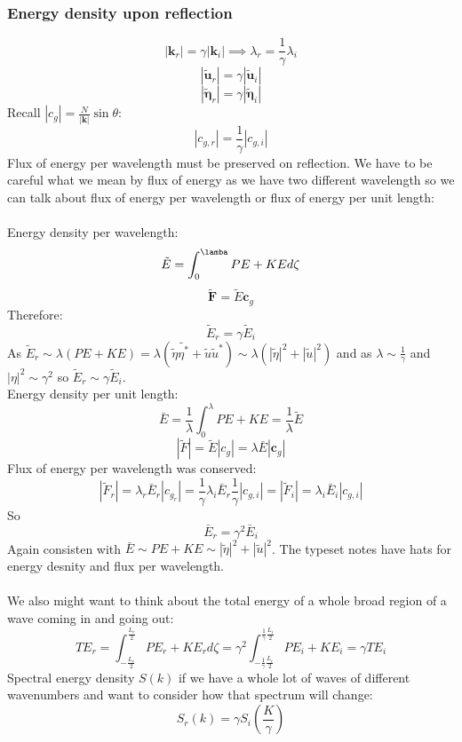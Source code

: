 \documentclass{article}
\begin{document}
\subsubsection{Energy density upon reflection}
$$
|\bm k_r|= \gamma |\bm k_i| \implies \lambda_r = \frac{1}{\gamma} \lambda_i
$$
$$
|\tilde{\bm u}_r | = \gamma |\tilde{\bm u}_i|
$$
$$
|\tilde{\bm \eta}_r | = \gamma |\tilde{\bm \eta}_i|
$$
Recall $|c_g|  = \frac{N}{|\bm k|} \sin \theta$:
$$
|c_{g,r}| = \frac{1}{\gamma} |c_{g,i}|
$$
Flux of energy per wavelength must be preserved on reflection. We have to be careful what we mean by flux of energy as we have two different wavelength so we can talk about flux of energy per wavelength or flux of energy per unit length:\\\\
Energy density per wavelength:
$$
\tilde E = \int_0^{\lamba} PE + KE d \zeta
$$
$$
\tilde {\bm F} = \tilde E \bm c_g
$$
Therefore:
$$
\tilde E_r = \gamma \tilde E_i
$$
As $\tilde E_r \sim \lambda( PE + KE) = \lambda ( \tilde{\eta} \tilde{\eta^*} + \tilde u \tilde u^*) \sim \lambda( |\tilde \eta|^2 + |\tilde u|^2)$ and as $\lambda \sim \frac{1}{\gamma}$ and $|\eta|^2 \sim \gamma^2$ so $\tilde E_r \sim \gamma \tilde E_i$.\\
Energy density per unit length:
$$
\bar E = \frac{1}{\lambda} \int_0^{\lambda} PE + KE = \frac{1}{\lambda} \tilde E
$$
$$
|\tilde F| = \tilde E | c_g | = \lambda \bar E | \bm c_g|
$$
Flux of energy per wavelength was conserved:
$$
|\tilde F_r| = \lambda_r \bar E_r|c_{g_r}| = \frac{1}{\gamma} \lambda_i \bar E_r \frac{1}{\gamma} |c_{g,i}| = |\tilde F_i| = \lambda_i \bar E_i |c_{g,i}|
$$
So 
$$
\bar E_r = \gamma^2 \bar E_i
$$
Again consisten with $\bar E \sim PE + KE \sim |\tilde \eta|^2 + | \tilde u|^2$. The typeset notes have hats for energy desnity and flux per wavelength.\\\\
We also might want to think about the total energy of a whole broad region of a wave coming in and going out:
$$
TE_r = \int_{- \frac{L_r}{2}}^{\frac{L_r}{2}} PE_r + KE_r d \zeta = \gamma^2 \int_{- \frac{1}{\gamma} \frac{L_i}{2}}^{\frac{1}{\gamma}\frac{L_i}{2}} PE_i + KE_i = \gamma TE_i
$$
Spectral energy density $S(k)$ if we have a whole lot of waves of different wavenumbers and want to consider how that spectrum will change:
$$
S_r(k) = \gamma S_i(\frac{K}{\gamma})
$$
\end{document}
